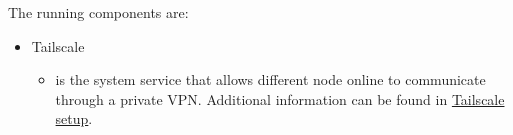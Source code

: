 
The running components are:
\begin{itemize}
    \item Tailscale
    \begin{itemize}
        \item {} is the system service that allows different node online to communicate through a private VPN.
        Additional information can be found in \hyperref[sec:tailscale-setup]{Tailscale setup}.
    \end{itemize}
\end{itemize}


